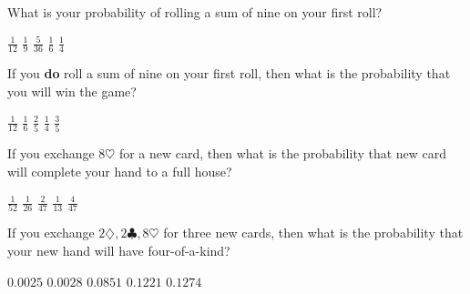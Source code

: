 \documentclass[answers,12pt]{exam}
\begin{document}
\begin{questions}
\question
What is your probability of rolling a sum
of nine on your first roll?\\
\begin{oneparchoices}
\choice $\frac{1}{12}$ %
\correctchoice $\frac{1}{9}$
\choice $\frac{5}{36}$
\choice $\frac{1}{6}$
\choice $\frac{1}{4}$ %
\end{oneparchoices}

\question\label{LastCraps}
If you {\bf do} roll a sum of nine on your first roll,
then what is the probability that you will win the game?\\
\begin{oneparchoices}
\choice $\frac{1}{12}$ %
\choice $\frac{1}{6}$  %
\correctchoice $\frac{2}{5}$  %
\choice $\frac{1}{4}$  %
\choice $\frac{3}{5}$  %
\end{oneparchoices}
\newpage


\question\label{FirstPoker} 
If you exchange $8\heartsuit$ for a new card,
then what is the probability that new card
will complete your hand to a full house?\\
\begin{oneparchoices}
\choice $\frac{1}{52}$
\choice $\frac{1}{26}$ %
\choice $\frac{2}{47}$ %
\choice $\frac{1}{13}$ %
\correctchoice $\frac{4}{47}$
\end{oneparchoices}

\question\label{LastPoker}
If you exchange $2\diamondsuit,2\clubsuit,8\heartsuit$ for three
new cards, then what is the probability that your new hand
will have four-of-a-kind?\\
\begin{oneparchoices}
\choice $0.0025$ %
\correctchoice $0.0028$
\choice $0.0851$ %
\choice $0.1221$ %
\choice $0.1274$ %
\end{oneparchoices}



\end{questions}
\end{document}
